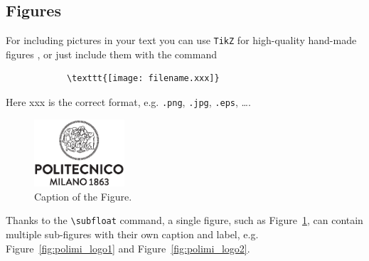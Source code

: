 \documentclass[11pt,a4paper]{article}
\begin{document}
    \subsection{Figures} \label{subsec:figures}

        For including pictures in your text you can use \texttt{TikZ} for high-quality hand-made figures \cite{tikz}, or just include them with the command

        \begin{verbatim}
            \texttt{[image: filename.xxx]}
        \end{verbatim}

        Here xxx is the correct format, e.g.  \verb|.png|, \verb|.jpg|, \verb|.eps|, \dots.

        \begin{figure}[H]
            \centering
            \includegraphics[width=0.3\textwidth]{logo_polimi_scritta.eps}
            \caption{Caption of the Figure.}
            \label{fig:quadtree}
        \end{figure}

        Thanks to the \texttt{\textbackslash subfloat} command, a single figure, such as Figure~\ref{fig:quadtree}, can contain multiple sub-figures with their own caption and label, e.g. Figure~\ref{fig:polimi_logo1} and Figure~\ref{fig:polimi_logo2}. 
\end{document}
